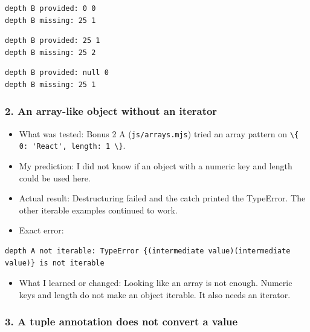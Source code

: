 \documentclass[
  11pt,
]{article}
\newcommand{\passthrough}[1]{#1}
\providecommand{\tightlist}{%
  \setlength{\itemsep}{0pt}\setlength{\parskip}{0pt}}
\begin{document}
\begin{lstlisting}
depth B provided: 0 0
depth B missing: 25 1
\end{lstlisting}

\begin{lstlisting}
depth B provided: 25 1
depth B missing: 25 2
\end{lstlisting}

\begin{lstlisting}
depth B provided: null 0
depth B missing: 25 1
\end{lstlisting}

\subsubsection{2. An array-like object without an
iterator}\label{an-array-like-object-without-an-iterator}

\begin{itemize}
\tightlist
\item
  What was tested: Bonus 2 A (\passthrough{\lstinline!js/arrays.mjs!})
  tried an array pattern on
  \passthrough{\lstinline!\{ 0: 'React', length: 1 \}!}.
\item
  My prediction: I did not know if an object with a numeric key and
  length could be used here.
\item
  Actual result: Destructuring failed and the catch printed the
  TypeError. The other iterable examples continued to work.
\item
  Exact error:
\end{itemize}

\begin{lstlisting}
depth A not iterable: TypeError {(intermediate value)(intermediate value)} is not iterable
\end{lstlisting}

\begin{itemize}
\tightlist
\item
  What I learned or changed: Looking like an array is not enough.
  Numeric keys and length do not make an object iterable. It also needs
  an iterator.
\end{itemize}

\subsubsection{3. A tuple annotation does not convert a
value}\label{a-tuple-annotation-does-not-convert-a-value}
\end{document}
